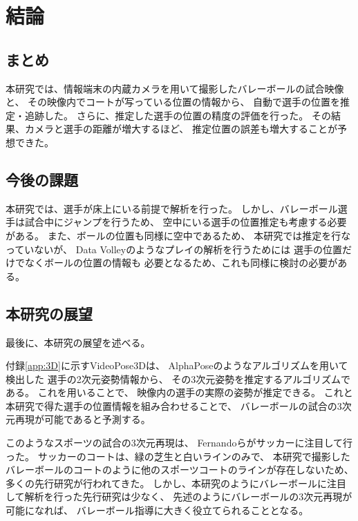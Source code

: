 \documentclass[a4j, fleqn, 12pt]{jsreport}
\begin{document}
\chapter{結論} \label{cha:epilogue}
    \section{まとめ}
        本研究では、情報端末の内蔵カメラを用いて撮影したバレーボールの試合映像と、
        その映像内でコートが写っている位置の情報から、
        自動で選手の位置を推定・追跡した。
        さらに、推定した選手の位置の精度の評価を行った。
        その結果、カメラと選手の距離が増大するほど、
        推定位置の誤差も増大することが予想できた。

    \section{今後の課題} \label{sec:problems}
        本研究では、選手が床上にいる前提で解析を行った。
        しかし、バレーボール選手は試合中にジャンプを行うため、
        空中にいる選手の位置推定も考慮する必要がある。
        また、ボールの位置も同様に空中であるため、
        本研究では推定を行なっていないが、
        Data Volleyのようなプレイの解析を行うためには
        選手の位置だけでなくボールの位置の情報も
        必要となるため、これも同様に検討の必要がある。

    \section{本研究の展望} \label{sec:prospect}
        最後に、本研究の展望を述べる。

        付録\ref{app:3D}に示すVideoPose3D\cite{Dario}は、
        AlphaPoseのようなアルゴリズムを用いて検出した
        選手の2次元姿勢情報から、
        その3次元姿勢を推定するアルゴリズムである。
        これを用いることで、
        映像内の選手の実際の姿勢が推定できる。
        これと本研究で得た選手の位置情報を組み合わせることで、
        バレーボールの試合の3次元再現が可能であると予測する。

        このようなスポーツの試合の3次元再現は、
        Fernandoら\cite{Fernando}がサッカーに注目して行った。
        サッカーのコートは、緑の芝生と白いラインのみで、
        本研究で撮影したバレーボールのコートのように他のスポーツコートのラインが存在しないため、
        多くの先行研究が行われてきた。
        しかし、本研究のようにバレーボールに注目して解析を行った先行研究は少なく、
        先述のようにバレーボールの3次元再現が可能になれば、
        バレーボール指導に大きく役立てられることとなる。
\end{document}
